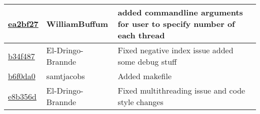 \documentclass{article}
\begin{document}
\begin{tabular}{l l l}
\href{https://github.com/El-Dringo-Brannde/CS444/commit/ea2bf27826aeaca0e6569fe4f30d000e668cf2f9}{ea2bf27} & WilliamBuffum & added commandline arguments for user to specify number of each thread\\\hline
\href{https://github.com/El-Dringo-Brannde/CS444/commit/b34f487448d60dbf56a5fd32ce0b26f427761d85}{b34f487} & El-Dringo-Brannde & Fixed negative index issue added some debug stuff\\\hline
\href{https://github.com/El-Dringo-Brannde/CS444/commit/b6f0da086658854d9b7f1fff40dddab9daa5fd8d}{b6f0da0} & samtjacobs & Added makefile\\\hline
\href{https://github.com/El-Dringo-Brannde/CS444/commit/e8b356d587abec4a48ff17831b3add9dd65beed8}{e8b356d} & El-Dringo-Brannde & Fixed multithreading issue and code style changes\\\hline
\end{tabular} 
\newpage
\end{document}
